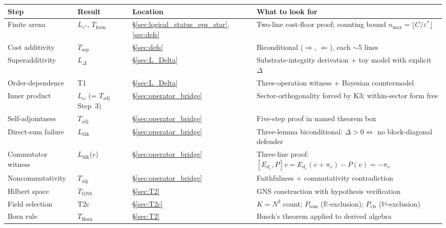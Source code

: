 \documentclass[11pt]{article}
\theoremstyle{remark}
\begin{document}
\smallskip
\begin{center}
\label{tab:proof_map}
\smallskip
\renewcommand{\arraystretch}{1.3}
\small
\begin{tabular}{@{}p{2.4cm}p{2.8cm}p{1.8cm}p{5.5cm}@{}}
\textbf{Step} & \textbf{Result} & \textbf{Location} & \textbf{What to look for} \\[2pt]
\hline\noalign{\smallskip}
Finite arena & $L_{\varepsilon^*}$, $T_{\mathrm{form}}$ & \S\ref{sec:logical_status_eps_star}, \ref{sec:defs} & Two-line cost-floor proof; counting bound $n_{\max} = \lfloor C/\varepsilon^*\rfloor$ \\[3pt]
Cost additivity & $T_{\mathrm{sep}}$ & \S\ref{sec:defs} & Biconditional ($\Rightarrow$, $\Leftarrow$), each $\sim$5 lines \\[3pt]
Superadditivity & $L_\Delta$ & \S\ref{sec:L_Delta} & Substrate-integrity derivation + toy model with explicit $\Delta$ \\[3pt]
Order-dependence & T1 & \S\ref{sec:L_Delta} & Three-operation witness + Bayesian countermodel \\[3pt]
Inner product & $L_\omega$ (= $T_{\mathrm{adj}}$ Step~3) & \S\ref{sec:operator_bridge} & Sector-orthogonality forced by K3; within-sector form free \\[3pt]
Self-adjointness & $T_{\mathrm{adj}}$ & \S\ref{sec:operator_bridge} & Five-step proof in named theorem box \\[3pt]
Direct-sum failure & $L_{\mathrm{blk}}$ & \S\ref{sec:operator_bridge} & Three-lemma biconditional: $\Delta > 0 \Leftrightarrow$ no block-diagonal defender \\[3pt]
Commutator witness & $L_{\mathrm{blk}}$(c) & \S\ref{sec:operator_bridge} & Three-line proof: $[E_{d_1}, P]v = E_{d_1}(v + \pi_v) - P(v) = -\pi_v$ \\[3pt]
Noncommutativity & $T_{\mathrm{alg}}$ & \S\ref{sec:operator_bridge} & Faithfulness + commutativity contradiction \\[3pt]
Hilbert space & $T_{\mathrm{GNS}}$ & \S\ref{sec:T2} & GNS construction with hypothesis verification \\[3pt]
Field selection & T2c & \S\ref{sec:T2c} & $K = N^2$ count; $P_{\mathrm{tom}}$ ($\mathbb{R}$-exclusion); $P_{\mathrm{cls}}$ ($\mathbb{H}$-exclusion) \\[3pt]
Born rule & $T_{\mathrm{Born}}$ & \S\ref{sec:T2} & Busch's theorem applied to derived algebra \\[3pt]
\end{tabular}
\end{center}
\end{document}
